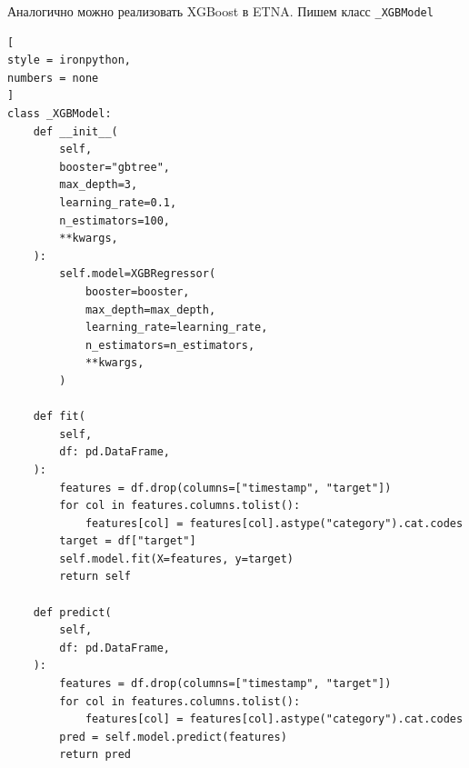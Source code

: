 \documentclass[%
	11pt,
	a4paper,
	utf8,
		]{article}
\begin{document}
Аналогично можно реализовать XGBoost в ETNA. Пишем класс \verb|_XGBModel|
\begin{lstlisting}[
style = ironpython,
numbers = none
]
class _XGBModel:
    def __init__(
        self,
        booster="gbtree",
        max_depth=3,
        learning_rate=0.1,
        n_estimators=100,
        **kwargs,
    ):
        self.model=XGBRegressor(
            booster=booster,
            max_depth=max_depth,
            learning_rate=learning_rate,
            n_estimators=n_estimators,
            **kwargs,
        )
        
    def fit(
        self,
        df: pd.DataFrame,
    ):
        features = df.drop(columns=["timestamp", "target"])
        for col in features.columns.tolist():
            features[col] = features[col].astype("category").cat.codes
        target = df["target"]
        self.model.fit(X=features, y=target)
        return self
        
    def predict(
        self,
        df: pd.DataFrame,
    ):
        features = df.drop(columns=["timestamp", "target"])
        for col in features.columns.tolist():
            features[col] = features[col].astype("category").cat.codes
        pred = self.model.predict(features)
        return pred
\end{lstlisting}
\end{document}
